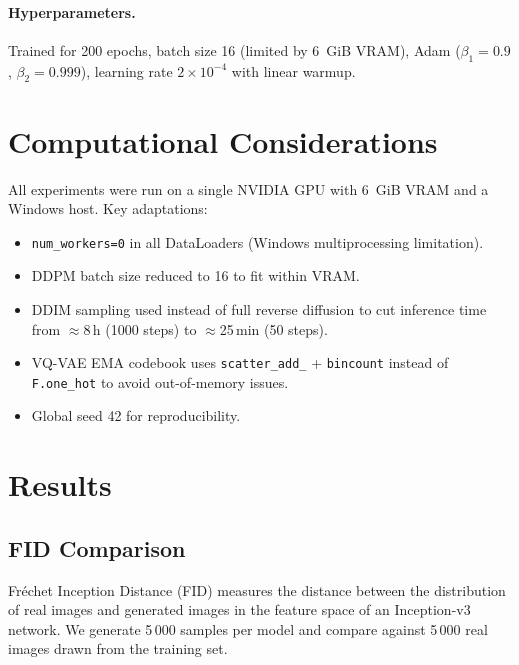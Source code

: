 \documentclass[12pt,a4paper]{article}
\begin{document}
\paragraph{Hyperparameters.}
Trained for 200 epochs, batch size 16 (limited by 6~GiB VRAM), Adam
($\beta_1=0.9$, $\beta_2=0.999$), learning rate $2 \times 10^{-4}$ with linear
warmup.

\section{Computational Considerations}
\label{sec:compute}

All experiments were run on a single NVIDIA GPU with 6~GiB VRAM and a Windows
host.  Key adaptations:

\begin{itemize}[noitemsep]
  \item \texttt{num\_workers=0} in all DataLoaders (Windows multiprocessing
        limitation).
  \item DDPM batch size reduced to 16 to fit within VRAM.
  \item DDIM sampling used instead of full reverse diffusion to cut inference
        time from $\approx8$\,h (1000 steps) to $\approx$25\,min (50 steps).
  \item VQ-VAE EMA codebook uses \texttt{scatter\_add\_} + \texttt{bincount}
        instead of \texttt{F.one\_hot} to avoid out-of-memory issues.
  \item Global seed 42 for reproducibility.
\end{itemize}

\section{Results}
\label{sec:results}

\subsection{FID Comparison}
\label{sec:fid}

Fr\'{e}chet Inception Distance (FID) \cite{fid} measures the distance between the
distribution of real images and generated images in the feature space of an
Inception-v3 network.  We generate 5\,000 samples per model and compare against
5\,000 real images drawn from the training set.
\end{document}
